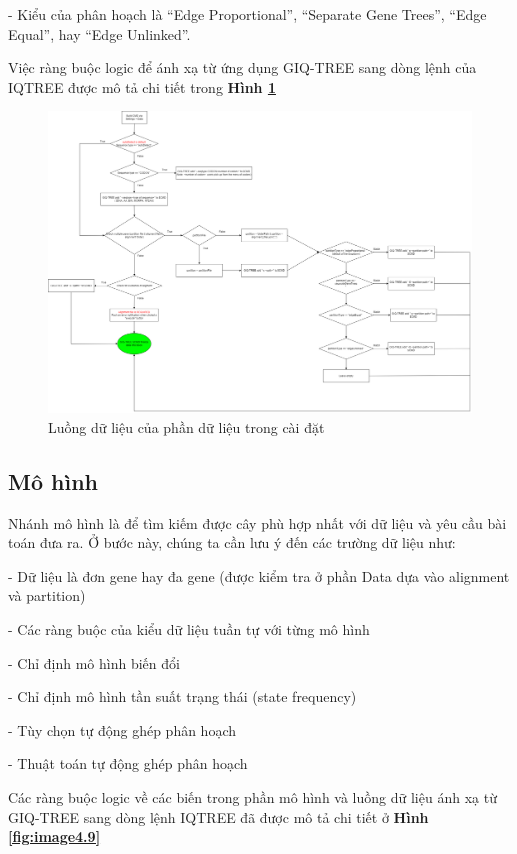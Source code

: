 \documentclass[12pt]{report}
\begin{document}
- Kiểu của phân hoạch là “Edge Proportional”, “Separate Gene Trees”, “Edge Equal”, hay “Edge Unlinked”.

Việc ràng buộc logic để ánh xạ từ ứng dụng GIQ-TREE sang dòng lệnh của IQTREE được mô tả chi tiết trong \textbf{Hình \ref{fig:image4.8}}

\begin{figure}[h]
	\centering
	\includegraphics[scale=0.23]{Image/4.8.png}
	\caption{Luồng dữ liệu của phần dữ liệu trong cài đặt }
	\label{fig:image4.8}
\end{figure}

\subsection{Mô hình}
Nhánh mô hình là để tìm kiếm được cây phù hợp nhất với dữ liệu và yêu cầu bài toán đưa ra. Ở bước này, chúng ta cần lưu ý đến các trường dữ liệu như:

- Dữ liệu là đơn gene hay đa gene (được kiểm tra ở phần Data dựa vào alignment và partition)

- Các ràng buộc của kiểu dữ liệu tuần tự với từng mô hình

- Chỉ định mô hình biến đổi

- Chỉ định mô hình tần suất trạng thái (state frequency)

- Tùy chọn tự động ghép phân hoạch

- Thuật toán tự động ghép phân hoạch 

Các ràng buộc logic về các biến trong phần mô hình và luồng dữ liệu ánh xạ từ GIQ-TREE sang dòng lệnh IQTREE đã được mô tả chi tiết ở \textbf{Hình \ref{fig:image4.9}}
\end{document}
